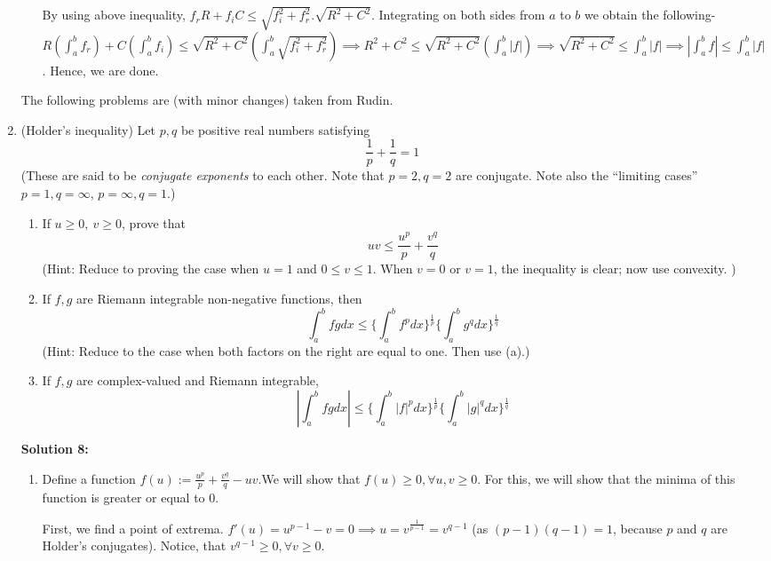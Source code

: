 \documentclass[11pt]{amsart}
\theoremstyle{definition}
\begin{document}
\begin{enumerate}[wide, labelwidth=!, labelindent=0pt]
\begin{enumerate}[label=(\alph*)]
By using above inequality, $f_r R + f_i C \le \sqrt{f_i^2 + f_r^2}.\sqrt{R^2 + C^2}$. Integrating on both sides from $a$ to $b$ we obtain the following- $R (\int_a^b f_r) + C (\int_a^b f_i) \le \sqrt{R^2 + C^2} (\int_a^b \sqrt{f_i^2 + f_r^2}) \implies R^2 + C^2 \le \sqrt{R^2 + C^2}(\int_a^b |f|) \implies \sqrt{R^2 + C^2} \le \int_a^b |f| \implies |\int_a^b f| \le \int_a^b |f|$. Hence, we are done.

\end{enumerate}

The following problems are (with minor changes) taken from Rudin. 

\item (Holder's inequality) Let $p,q$ be positive real numbers satisfying
\[
\frac{1}{p} + \frac{1}{q} =1 
\]
(These  are said to be \emph{conjugate exponents} to each other. Note that $p=2,q=2$ are conjugate. Note also the ``limiting cases'' $p=1,q=\infty$, $p=\infty, q=1$.)
\begin{enumerate}[label=(\alph*)]
\item If $u \ge 0, \ v \ge 0$, prove that
\[
uv \le \frac{u^p}{p}+\frac{v^q}{q}
\]
(Hint: Reduce to proving the case when $u=1$ and $0 \le v \le 1$. When $v=0$ or $v=1$, the inequality is clear; now use convexity. )
\item  If $f,g$ are Riemann integrable non-negative functions, then
\[
\int_a^b fg dx  \le \{\int_a^b f^p dx\}^{\frac{1}{p}} \{\int_a^b g^q dx\}^{\frac{1}{q}}
\]
(Hint: Reduce to the case when both factors on the right are equal to one. Then use (a).)
\item If $f,g$ are complex-valued and Riemann integrable,
\[
|\int_a^b fg dx|  \le \{\int_a^b |f|^p dx\}^{\frac{1}{p}} \{\int_a^b |g|^q dx\}^{\frac{1}{q}}
\]

\end{enumerate} 

\textbf{Solution 8:}
\begin{enumerate}[label=(\alph*)]

\item

Define a function $f(u) := \frac{u^p}{p}+\frac{v^q}{q} - u v$.We will show that $f(u) \ge 0, \forall u,v \ge 0$. For this, we will show that the minima of this function is greater or equal to $0$.

First, we find a point of extrema. $f'(u) = u^{p-1} - v = 0 \implies u = v^{\frac{1}{p-1}} = v^{q-1}$ (as $(p-1)(q-1)= 1$, because $p$ and $q$ are Holder's conjugates). Notice, that $v^{q-1} \ge 0, \forall v \ge 0$.


\end{enumerate}
\end{enumerate}
\end{document}
